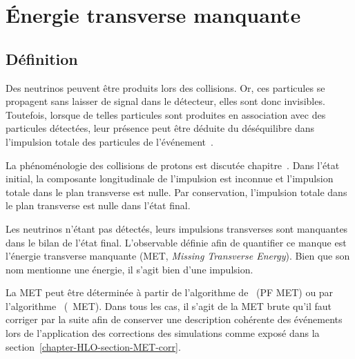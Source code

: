 \section{Énergie transverse manquante}\label{chapter-HLO-section-MET}
\subsection{Définition}\label{chapter-HLO-section-MET-raw}
Des neutrinos peuvent être produits lors des collisions.
Or, ces particules se propagent sans laisser de signal dans le détecteur, elles sont donc invisibles.
Toutefois, lorsque de telles particules sont produites en association avec des particules détectées, leur présence peut être déduite du déséquilibre dans l'impulsion totale des particules de l'événement~\cite{CMS-PAS-JME-17-001}.
\par
La phénoménologie des collisions de protons est discutée chapitre~.
Dans l'état initial,
la composante longitudinale de l'impulsion est inconnue
et
l'impulsion totale dans le plan transverse est nulle.
Par conservation, l'impulsion totale dans le plan transverse est nulle dans l'état final.
\par
Les neutrinos n'étant pas détectés, leurs impulsions transverses sont manquantes dans le bilan de l'état final.
L'observable définie afin de quantifier ce manque est
l'énergie transverse manquante (MET, \emph{Missing Transverse Energy}).
Bien que son nom mentionne une énergie, il s'agit bien d'une impulsion.
\par
La MET peut être déterminée à partir de l'algorithme de \PF\ (PF MET)
ou
par l'algorithme \PUPPI\ (\PUPPI\ MET).
Dans tous les cas, il s'agit de la MET brute qu'il faut corriger par la suite afin de conserver une description cohérente des événements lors de l'application des corrections des simulations comme exposé dans la section~\ref{chapter-HLO-section-MET-corr}.
